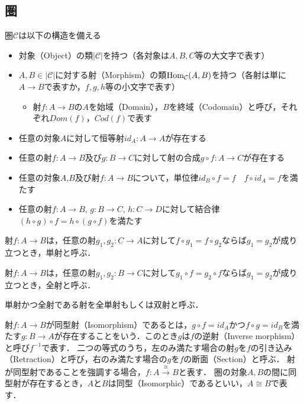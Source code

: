 \documentclass[type_judgement.tex]{subfiles}
\begin{document}
\subsection{圏}
\begin{defn}[Category（圏）]
圏$\mathcal{C}$は以下の構造を備える
\begin{itemize}
    \item 対象（Object）の類$|\mathcal{C}|$を持つ（各対象は$A,B,C$等の大文字で表す）
    \item $A,B\in|\mathcal{C}|$に対する射（Morphism）の類$\mathop{\mathrm{Hom}}\nolimits_\mathcal{C}(A,B)$を持つ（各射は単に$A \rightarrow B$で表すか，$f,g,h$等の小文字で表す）
        \begin{itemize}
            \item 射$f:A \rightarrow B$の$A$を始域（Domain），$B$を終域（Codomain）と呼び，それぞれ$Dom(f)$，$Cod(f)$で表す
        \end{itemize}
    \item 任意の対象$A$に対して恒等射$id_A:A \rightarrow A$が存在する
    \item 任意の射$f:A \rightarrow B$及び$g:B \rightarrow C$に対して射の合成$g \circ f: A \rightarrow C$が存在する
    \item 任意の対象$A$,$B$及び射$f:A \rightarrow B$について，単位律$id_B \circ f = f$　$f \circ id_A = f$を満たす
    \item 任意の射$f:A \rightarrow B$, $g:B \rightarrow C$, $h:C \rightarrow D$に対して結合律$(h \circ g) \circ f = h \circ (g \circ f)$を満たす
\end{itemize}

\begin{defn}[Monomorphism（単射）]
射$f:A \rightarrow B$は，任意の射$g_1,g_2:C \rightarrow A$に対して$f \circ g_1 = f \circ g_2$ならば$g_1 = g_2$が成り立つとき，単射と呼ぶ．
\end{defn}

\begin{defn}[Epimorphism（全射）]
射$f:A \rightarrow B$は，任意の射$g_1,g_2:B \rightarrow C$に対して$g_1 \circ f = g_2 \circ f$ならば$g_1 = g_2$が成り立つとき，全射と呼ぶ．
\end{defn}

\begin{defn}[Bimorphism（双射）]
単射かつ全射である射を全単射もしくは双射と呼ぶ．
\end{defn}

\begin{defn}
射$f:A \rightarrow B$が同型射（Isomorphism）であるとは，$g \circ f = id_A$かつ$f \circ g = id_B$を満たす$g:B \rightarrow A$が存在することをいう．このとき$g$は$f$の逆射（Inverse morphism）と呼び$f^{-1}$で表す．
二つの等式のうち，左のみ満たす場合の射$g$を$f$の引き込み（Retraction）と呼び，右のみ満たす場合の$g$を$f$の断面（Section）と呼ぶ．
射が同型射であることを強調する場合，$f:A \xrightarrow{\cong} B$と表す．
圏の対象$A,B$の間に同型射が存在するとき，$A$と$B$は同型（Isomorphic）であるといい，$A \cong B$で表す．
\end{defn}


\end{defn}
\end{document}
